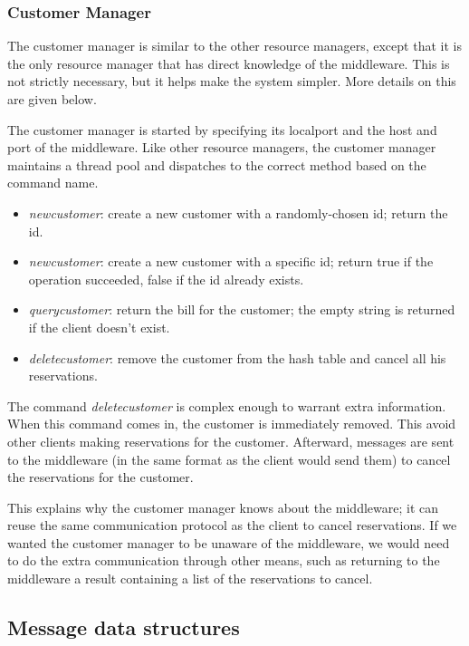 \documentclass[11pt]{article}
\begin{document}
\subsubsection{Customer Manager}

The customer manager is similar to the other resource managers, except
that it is the only resource manager that has direct knowledge of the
middleware.  This is not strictly necessary, but it helps make the
system simpler.  More details on this are given below.

The customer manager is started by specifying its localport and the
host and port of the middleware.  Like other resource managers, the
customer manager maintains a thread pool and dispatches to the correct
method based on the command name.


\begin{itemize}
\item {\it newcustomer}: create a new customer with a randomly-chosen
  id; return the id.
\item {\it newcustomer}: create a new customer with a specific id;
  return true if the operation succeeded, false if the id already exists.
\item {\it querycustomer}: return the bill for the customer; the empty
  string is returned if the client doesn't exist.
\item {\it deletecustomer}: remove the customer from the hash table
  and cancel all his reservations.
\end{itemize}

The command {\it deletecustomer} is complex enough to warrant extra
information.  When this command comes in, the customer is immediately
removed.  This avoid other clients making reservations for the
customer. Afterward, messages are sent to the middleware (in the same
format as the client would send them) to cancel the reservations for
the customer.

This explains why the customer manager knows about the middleware; it
can reuse the same communication protocol as the client to cancel
reservations.  If we wanted the customer manager to be unaware of the
middleware, we would need to do the extra communication through other
means, such as returning to the middleware a result containing a list
of the reservations to cancel.

\subsection{Message data structures}
\end{document}
